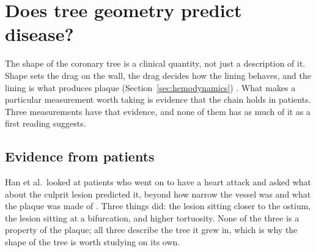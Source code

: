 %
%
%
%

\section{Does tree geometry predict disease?}
\label{sec:geometry}

The shape of the coronary tree is a clinical quantity, not just a description of it.
Shape sets the drag on the wall, the drag decides how the lining behaves, and the lining is what
produces plaque (Section~\ref{sec:hemodynamics}) \cite{rampidis2022geometry}.
What makes a particular measurement worth taking is evidence that the chain holds in patients.
Three measurements have that evidence, and none of them has as much of it as a first reading
suggests.

\subsection{Evidence from patients}

Han et al.\ looked at patients who went on to have a heart attack and asked what about the culprit
lesion predicted it, beyond how narrow the vessel was and what the plaque was made of
\cite{han2022plaque}.
Three things did: the lesion sitting closer to the ostium, the lesion sitting at a bifurcation, and
higher tortuosity.
None of the three is a property of the plaque; all three describe the tree it grew in, which is
why the shape of the tree is worth studying on its own.

